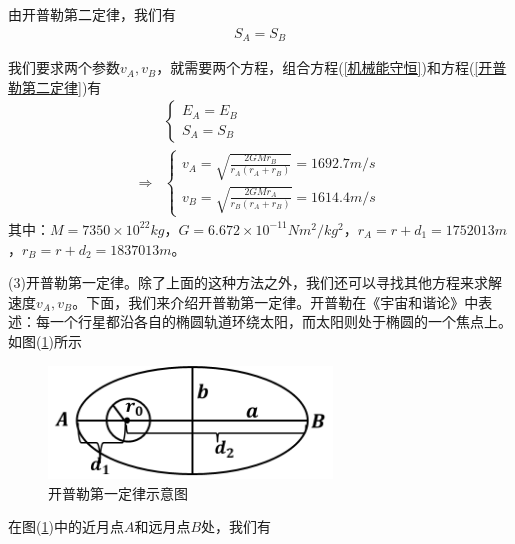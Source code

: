             由开普勒第二定律，我们有
            \begin{align}
            \label{开普勒第二定律}
            S_A = S_B
            \end{align}
            \par
            我们要求两个参数$v_A,v_B$，就需要两个方程，组合方程(\ref{机械能守恒})和方程(\ref{开普勒第二定律})有
            \begin{align*}
            &\left\{
            \begin{aligned}
            E_A = E_B\\
            S_A = S_B
            \end{aligned}
            \right.\\
            \Rightarrow &\left\{
            \begin{aligned}
            v_A = \sqrt{\frac{2GMr_B}{r_A(r_A+r_B)}} = 1692.7m/s\\
            v_B = \sqrt{\frac{2GMr_A}{r_B(r_A+r_B)}} = 1614.4m/s
            \end{aligned}
            \right.
            \end{align*}
            其中：$M = 7350\times 10^{22}kg$，$G=6.672\times 10^{-11}N m^2/kg^2$，$r_A = r+d_1 = 1752013m$，$r_B = r+d_2 = 1837013m$。
            \par
            (3)开普勒第一定律。除了上面的这种方法之外，我们还可以寻找其他方程来求解速度$v_A,v_B$。下面，我们来介绍开普勒第一定律。开普勒在《宇宙和谐论》中表述：每一个行星都沿各自的椭圆轨道环绕太阳，而太阳则处于椭圆的一个焦点上。如图(\ref{fig:开普勒第一定律示意图})所示
            \begin{figure}[H]
            \centering
            \includegraphics[height=3cm]{images/Kepler_First_Law.jpg}
            \caption{开普勒第一定律示意图}
            \label{fig:开普勒第一定律示意图}
            \end{figure}
            \par
            在图(\ref{fig:开普勒第一定律示意图})中的近月点$A$和远月点$B$处，我们有
